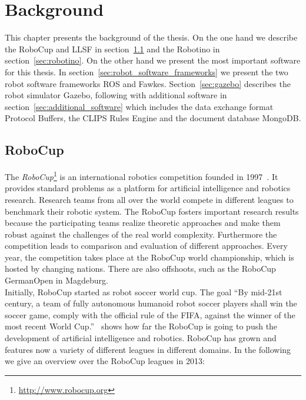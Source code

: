 \chapter{Background}
\label{cha:background}
This chapter presents the background of the thesis. On the one hand we describe the RoboCup and LLSF in section~\ref{sec:robocup} and the Robotino in section~\ref{sec:robotino}. On the other hand we present the most important software for this thesis. In section~\ref{sec:robot_software_frameworks} we present the two robot software frameworks ROS and Fawkes. Section~\ref{sec:gazebo} describes the robot simulator Gazebo, following with additional software in section~\ref{sec:additional_software} which includes the data exchange format Protocol Buffers, the CLIPS Rules Engine and the document database MongoDB.

\section{RoboCup}
\label{sec:robocup}
The \textit{RoboCup}\footnote{\url{http://www.robocup.org}} is an international robotics competition founded in 1997~\cite{Robocup}. It provides standard problems as a platform for artificial intelligence and robotics research. Research teams from all over the world compete in different leagues to benchmark their robotic system. The RoboCup fosters important research results because the participating teams realize theoretic approaches and make them robust against the challenges of the real world complexity. Furthermore the competition leads to comparison and evaluation of different approaches. Every year, the competition takes place at the RoboCup world championship, which is hosted by changing nations. There are also offshoots, such as the RoboCup GermanOpen in Magdeburg.\\
Initially, RoboCup started as robot soccer world cup. The goal ``By mid-21st century, a team of fully autonomous humanoid robot soccer players shall win the soccer game, comply with the official rule of the FIFA, against the winner of the most recent World Cup.''~\cite{robocup_goal} shows how far the RoboCup is going to push the development of artificial intelligence and robotics. RoboCup has grown and features now a variety of different leagues in different domains. In the following we give an overview over the RoboCup leagues in 2013:\\
